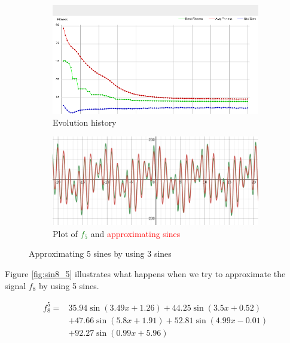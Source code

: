 \documentclass[conference]{IEEEtran}
\begin{document}
\begin{figure}[h]
\begin{subfigure}{.8\linewidth}
  \centering
  \includegraphics[width=.9\linewidth]{img/sin5_3.png}
  \caption{Evolution history}
  \label{fig:hist_sin5_3}
\end{subfigure}

\begin{subfigure}{.8\linewidth}
  \centering
  \includegraphics[width=.9\linewidth]{img/plot_sin5_3.png}
  \caption{Plot of \textcolor{ForestGreen}{$f_5$} and \textcolor{red}{approximating sines}}
  \label{fig:plot_sin5_3}
\end{subfigure}
\caption{Approximating 5 sines by using 3 sines}
\label{fig:sin5_3}
\end{figure}

Figure \ref{fig:sin8_5} illustrates what happens when we try to approximate the signal $f_8$ by using 5 sines.

\begin{equation}
	\begin{split}
		f_8^5 =& 35.94\sin(3.49x+1.26) + 44.25\sin(3.5x+0.52) \\
		&+ 47.66\sin(5.8x+1.91) + 52.81\sin(4.99x-0.01) \\
		&+ 92.27\sin(0.99x+5.96)
	\end{split}
	\label{eq:f8_5}
\end{equation}
\end{document}
